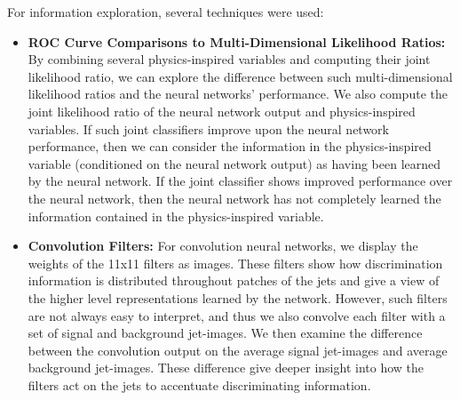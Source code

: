 %

For information exploration, several techniques were used:
\begin{itemize}

\item \textbf{ROC Curve Comparisons to Multi-Dimensional Likelihood Ratios:}  By combining several physics-inspired variables and computing their joint likelihood ratio, we can explore the difference between such multi-dimensional likelihood ratios and the neural networks' performance.  We also compute the joint likelihood ratio of the neural network output and physics-inspired variables.  If such joint classifiers improve upon the neural network performance, then we can consider the information in the physics-inspired variable (conditioned on the neural network output) as having been learned by the neural network.  If the joint classifier shows improved performance over the neural network, then the neural network has not completely learned the information contained in the physics-inspired variable.

\item \textbf{Convolution Filters:}  For convolution neural networks, we display the weights of the 11x11 filters as images.  These filters show how discrimination information is distributed throughout patches of the jets and give a view of the higher level representations learned by the network.  However, such filters are not always easy to interpret, and thus we also convolve each filter with a set of signal and background jet-images.  We then examine the difference between the  convolution output on the average signal jet-images and average background jet-images.  These difference give deeper insight into how the filters act on the jets to accentuate discriminating information.


\end{itemize}
